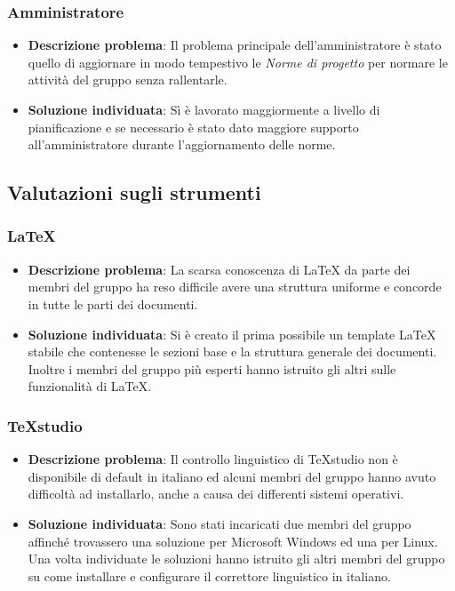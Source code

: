 	\subsubsection{Amministratore}
		\begin{itemize}
			\item \textbf{Descrizione problema}: Il problema principale dell'amministratore è stato quello di aggiornare in modo tempestivo le \textit{Norme di progetto} per normare le attività del gruppo senza rallentarle.
			\item \textbf{Soluzione individuata}: Sì è lavorato maggiormente a livello di pianificazione e se necessario è stato dato maggiore supporto all'amministratore durante l'aggiornamento delle norme.
		\end{itemize}
\subsection{Valutazioni sugli strumenti}
	\subsubsection{\LaTeX}
		\begin{itemize}
			\item \textbf{Descrizione problema}: La scarsa conoscenza di \LaTeX\xspace da parte dei membri del gruppo ha reso difficile avere una struttura uniforme e concorde in tutte le parti dei documenti.
			\item \textbf{Soluzione individuata}: Si è creato il prima possibile un template \LaTeX\xspace stabile che contenesse le sezioni base e la struttura generale dei documenti. Inoltre i membri del gruppo più esperti hanno istruito gli altri sulle funzionalità di \LaTeX.
		\end{itemize}
	\subsubsection{TeXstudio}
		\begin{itemize}
			\item \textbf{Descrizione problema}: Il controllo linguistico di TeXstudio non è disponibile di default in italiano ed alcuni membri del gruppo hanno avuto difficoltà ad installarlo, anche a causa dei differenti sistemi operativi.
			\item \textbf{Soluzione individuata}: Sono stati incaricati due membri del gruppo affinché trovassero una soluzione per Microsoft Windows ed una per Linux. Una volta individuate le soluzioni hanno istruito gli altri membri del gruppo su come installare e configurare il correttore linguistico in italiano.
		\end{itemize}
